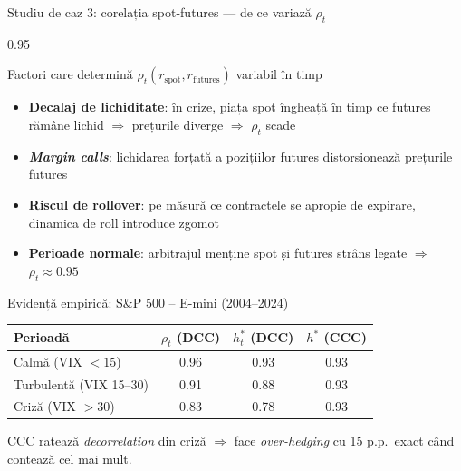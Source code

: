 \documentclass[9pt, aspectratio=169, t]{beamer}
\begin{document}
\begin{frame}{Studiu de caz 3: corelația spot-futures --- de ce variază $\rho_t$}
    \begin{cminipage}{0.95\textwidth}
    {\footnotesize
    \begin{block}{Factori care determină $\rho_t(r_{\text{spot}}, r_{\text{futures}})$ variabil în timp}
        \begin{itemize}\setlength{\itemsep}{1pt}
            \item \textbf{Decalaj de lichiditate}: în crize, piața spot îngheață în timp ce futures rămâne lichid $\Rightarrow$ prețurile diverge $\Rightarrow$ $\rho_t$ scade
            \item \textbf{\textit{Margin calls}}: lichidarea forțată a pozițiilor futures distorsionează prețurile futures
            \item \textbf{Riscul de rollover}: pe măsură ce contractele se apropie de expirare, dinamica de roll introduce zgomot
            \item \textbf{Perioade normale}: arbitrajul menține spot și futures strâns legate $\Rightarrow$ $\rho_t \approx 0.95$
        \end{itemize}
    \end{block}
    \begin{exampleblock}{Evidență empirică: S\&P 500 -- E-mini (2004--2024)}
        {\small
        \begin{center}
        \begin{tabular}{l|ccc}
            \hline
            \textbf{Perioadă} & $\rho_t$ (DCC) & $h_t^*$ (DCC) & $h^*$ (CCC) \\
            \hline
            Calmă (VIX $< 15$)       & 0.96 & 0.93 & 0.93 \\
            Turbulentă (VIX 15--30)  & 0.91 & 0.88 & 0.93 \\
            Criză (VIX $> 30$)       & 0.83 & 0.78 & 0.93 \\
            \hline
        \end{tabular}
        \end{center}
        }
        CCC ratează \textit{decorrelation} din criză $\Rightarrow$ face \textit{over-hedging} cu 15 p.p.\ exact când contează cel mai mult.
    \end{exampleblock}
    }
    \end{cminipage}
\end{frame}
\end{document}
